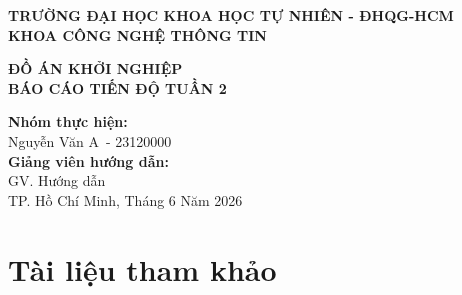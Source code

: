 \documentclass[12pt,a4paper]{article}
\newcommand{\weeknumber}{2}
\newcommand{\reporttitle}{BÁO CÁO TIẾN ĐỘ TUẦN \weeknumber}
\newcommand{\subject}{ĐỒ ÁN KHỞI NGHIỆP}
\newcommand{\studentname}{Nguyễn Văn A}
\newcommand{\studentid}{23120000}
\newcommand{\instructor}{GV. Hướng dẫn}
\begin{document}
\begin{titlepage}
    \begin{center}
        \large
        \textbf{TRƯỜNG ĐẠI HỌC KHOA HỌC TỰ NHIÊN - ĐHQG-HCM} \\
        \textbf{KHOA CÔNG NGHỆ THÔNG TIN} \\
        \vspace{1cm}
        \vspace{1.5cm}
        
        \Large
        \textcolor{primary}{\textbf{\subject}} \\
        \vspace{1cm}
        \huge
        \textcolor{primary}{\textbf{\reporttitle}} \\
        \vspace{1.5cm}
        
        \large
        \textbf{Nhóm thực hiện:} \\
        \studentname\ - \studentid \\
        \vspace{1cm}
        \textbf{Giảng viên hướng dẫn:} \\
        \instructor \\
        
        \vfill
        \large
        TP. Hồ Chí Minh, Tháng 6 Năm 2026
    \end{center}
\end{titlepage}

\newpage
\tableofcontents
\newpage




\section{Tài liệu tham khảo}


\end{document}
